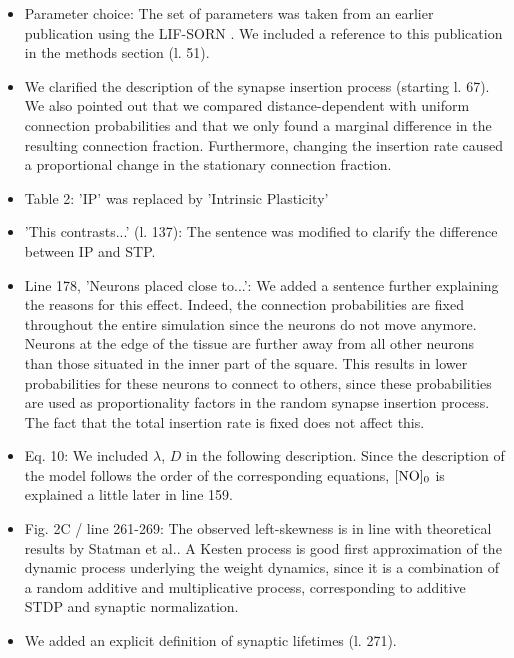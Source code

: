 \documentclass[10pt,a4paper]{article}
\begin{document}
\begin{itemize}
\item Parameter choice: The set of parameters was taken from an earlier publication using the LIF-SORN . We included a reference to this publication in the methods section (l. 51).

\item We clarified the description of the synapse insertion process (starting l. 67). We also pointed out that we compared distance-dependent with uniform connection probabilities and that we only found a marginal difference in the resulting connection fraction. Furthermore, changing the insertion rate caused a proportional change in the stationary connection fraction.

\item Table 2: 'IP' was replaced by 'Intrinsic Plasticity'

\item 'This contrasts...' (l. 137): The sentence was modified to clarify the difference between IP and STP.

\item Line 178, 'Neurons placed close to...': We added a sentence further explaining the reasons for this effect. Indeed, the connection probabilities are fixed throughout the entire simulation since the neurons do not move anymore. Neurons at the edge of the tissue are further away from all other neurons than those situated in the inner part of the square. This results in lower probabilities for these neurons to connect to others, since these probabilities are used as proportionality factors in the random synapse insertion process. The fact that the total insertion rate is fixed does not affect this.

\item Eq. 10: We included $\lambda$, $D$ in the following description. Since the description of the model follows the order of the corresponding equations, $\rm [NO]_0$ is explained a little later in line 159.

\item Fig. 2C / line 261-269: The observed left-skewness is in line with theoretical results by Statman et al.. A Kesten process is good first approximation of the dynamic process underlying the weight dynamics, since it is a combination of a random additive and multiplicative process, corresponding to additive STDP and synaptic normalization.

\item We added an explicit definition of synaptic lifetimes (l. 271).


\end{itemize}
\end{document}
